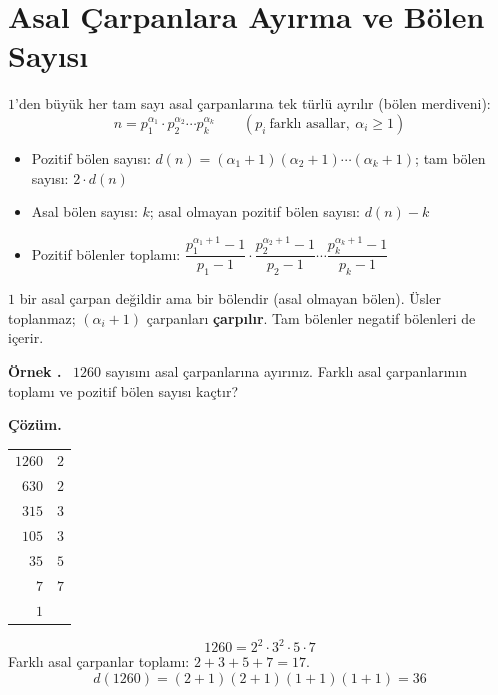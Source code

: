 \documentclass[11pt,a4paper]{article}
\newcounter{ornek}
\newenvironment{ornek}{\refstepcounter{ornek}\par\medskip\noindent\textbf{\color{anamavi}Örnek \theornek.}\ }{\par}
\newenvironment{cozum}{\begin{tcolorbox}[colback=cozumyesil!6,colframe=cozumyesil,boxrule=0.5pt,left=4pt,right=4pt,top=2pt,bottom=2pt,breakable]\textbf{\color{cozumyesil}Çözüm.}\ }{\end{tcolorbox}}
\begin{document}
\section{Asal Çarpanlara Ayırma ve Bölen Sayısı}

\begin{kural}
\(1\)'den büyük her tam sayı asal çarpanlarına tek türlü ayrılır (bölen merdiveni):
\[n=p_1^{\alpha_1}\cdot p_2^{\alpha_2}\cdots p_k^{\alpha_k}\qquad(p_i\ \text{farklı asallar},\ \alpha_i\ge 1)\]
\begin{itemize}[leftmargin=*,itemsep=1pt]
\item Pozitif bölen sayısı: \(d(n)=(\alpha_1+1)(\alpha_2+1)\cdots(\alpha_k+1)\); \quad tam bölen sayısı: \(2\cdot d(n)\)
\item Asal bölen sayısı: \(k\); \quad asal olmayan pozitif bölen sayısı: \(d(n)-k\)
\item Pozitif bölenler toplamı: \(\dfrac{p_1^{\alpha_1+1}-1}{p_1-1}\cdot\dfrac{p_2^{\alpha_2+1}-1}{p_2-1}\cdots\dfrac{p_k^{\alpha_k+1}-1}{p_k-1}\)
\end{itemize}
\end{kural}

\begin{dikkat}
\(1\) bir asal çarpan değildir ama bir bölendir (asal olmayan bölen). Üsler toplanmaz; \((\alpha_i+1)\) çarpanları \textbf{çarpılır}. Tam bölenler negatif bölenleri de içerir.
\end{dikkat}

\begin{ornek}
\(1260\) sayısını asal çarpanlarına ayırınız. Farklı asal çarpanlarının toplamı ve pozitif bölen sayısı kaçtır?
\end{ornek}
\begin{cozum}
\begin{minipage}[t]{0.18\linewidth}
\begin{tabular}{r|l}
\(1260\) & \(2\)\\ \(630\) & \(2\)\\ \(315\) & \(3\)\\ \(105\) & \(3\)\\ \(35\) & \(5\)\\ \(7\) & \(7\)\\ \(1\) &
\end{tabular}
\end{minipage}\hfill
\begin{minipage}[t]{0.62\linewidth}
\[1260=2^2\cdot 3^2\cdot 5\cdot 7\]
Farklı asal çarpanlar toplamı: \(2+3+5+7=17\).
\[d(1260)=(2+1)(2+1)(1+1)(1+1)=36\]
\end{minipage}
\end{cozum}
\end{document}
